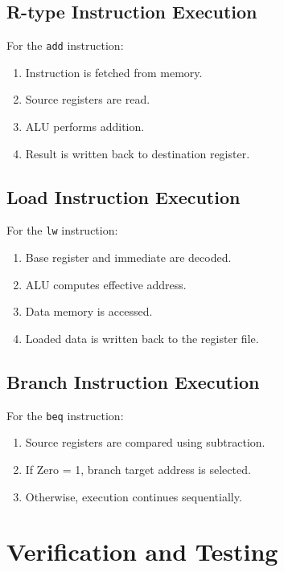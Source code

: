 \documentclass[10pt,a4paper,twocolumn]{article}
\begin{document}
\subsection{R-type Instruction Execution}

For the \texttt{add} instruction:

\begin{enumerate}
    \item Instruction is fetched from memory.
    \item Source registers are read.
    \item ALU performs addition.
    \item Result is written back to destination register.
\end{enumerate}

\subsection{Load Instruction Execution}

For the \texttt{lw} instruction:

\begin{enumerate}
    \item Base register and immediate are decoded.
    \item ALU computes effective address.
    \item Data memory is accessed.
    \item Loaded data is written back to the register file.
\end{enumerate}

\subsection{Branch Instruction Execution}

For the \texttt{beq} instruction:

\begin{enumerate}
    \item Source registers are compared using subtraction.
    \item If Zero = 1, branch target address is selected.
    \item Otherwise, execution continues sequentially.
\end{enumerate}

\section{Verification and Testing}
\end{document}

